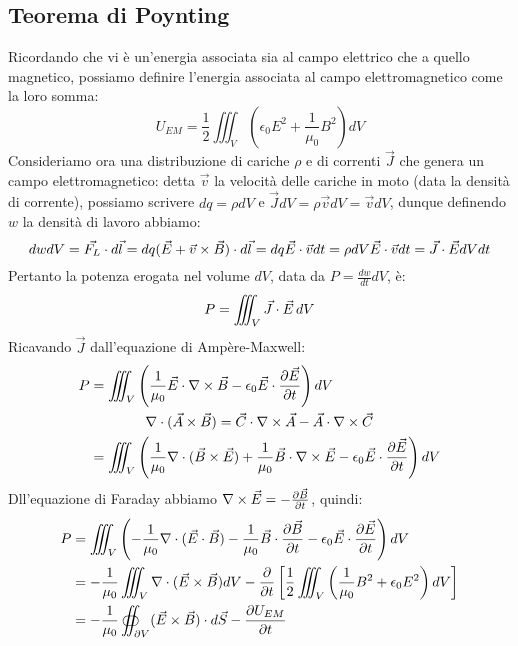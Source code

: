 \documentclass[]{article}
\begin{document}
\subsection{Teorema di Poynting}

Ricordando che vi è un'energia associata sia al campo elettrico che a quello magnetico, possiamo definire l'energia associata al campo elettromagnetico come la loro somma:
\begin{equation}
	U_{EM} = \frac{1}{2} \iiint_V \left( \epsilon_0 E^2 + \frac{1}{\mu_0} B^2\right) dV
	\label{eq:29}
\end{equation}
%
Consideriamo ora una distribuzione di cariche $ \rho $ e di correnti $ \vec{J} $ che genera un campo elettromagnetico: detta $ \vec{v} $ la velocità delle cariche in moto (data la densità di corrente), possiamo scrivere $ dq = \rho dV $ e $ \vec{J} dV = \rho \vec{v} dV = \vec{v} dV $, dunque definendo $ w $ la densità di lavoro abbiamo:
\begin{equation}
	dw dV = \vec{F_L} \cdot d\vec{l} = dq (\vec{E} + \vec{v}\times\vec{B})\cdot d\vec{l} = dq \vec{E}\cdot\vec{v} dt = \rho dV \vec{E}\cdot\vec{v} dt = \vec{J}\cdot\vec{E} dV dt
	\label{eq:30}
\end{equation}
Pertanto la potenza erogata nel volume $ dV $, data da $ P = \frac{dw}{dt} dV $, è:
\begin{equation}
	P = \iiint_V \vec{J}\cdot\vec{E} \,dV
	\label{eq:31}
\end{equation}
Ricavando $ \vec{J} $ dall'equazione di Ampère-Maxwell:
\begin{equation}
	\begin{split}
		P &= \iiint_V \left(\frac{1}{\mu_0} \vec{E} \cdot \nabla\times\vec{B} - \epsilon_0 \vec{E} \cdot \frac{\partial\vec{E}}{\partial t}\right) dV \\ 
		  &\qquad\qquad \nabla\cdot(\vec{A}\times\vec{B}) = \vec{C} \cdot \nabla\times\vec{A} - \vec{A} \cdot \nabla\times\vec{C} \\ 
		  &= \iiint_V \left(\frac{1}{\mu_0} \nabla\cdot(\vec{B}\times\vec{E}) + \frac{1}{\mu_0} \vec{B} \cdot \nabla\times\vec{E} - \epsilon_0 \vec{E} \cdot \frac{\partial\vec{E}}{\partial t}\right) dV
	\end{split}
	\label{eq:32}
\end{equation}
Dll'equazione di Faraday abbiamo $ \nabla\times\vec{E} = - \frac{\partial\vec{B}}{\partial t} $, quindi:
\begin{equation}
	\begin{split}
		P &= \iiint_V \left( - \frac{1}{\mu_0} \nabla\cdot(\vec{E}\cdot\vec{B}) - \frac{1}{\mu_0} \vec{B} \cdot \frac{\partial\vec{B}}{\partial t} - \epsilon_0 \vec{E} \cdot \frac{\partial\vec{E}}{\partial t}\right) dV \\ 
		  &= - \frac{1}{\mu_0} \iiint_V \nabla\cdot(\vec{E}\times\vec{B}) dV - \frac{\partial}{\partial t} \left[\frac{1}{2} \iiint_V \left(\frac{1}{\mu_0} B^2 + \epsilon_0 E^2\right) dV \right] \\ 
		  &= - \frac{1}{\mu_0} \oiint_{\partial V} (\vec{E}\times\vec{B})\cdot d\vec{S} - \frac{\partial U_{EM}}{\partial t}
	\end{split}
	\label{eq:33}
\end{equation}
\end{document}
